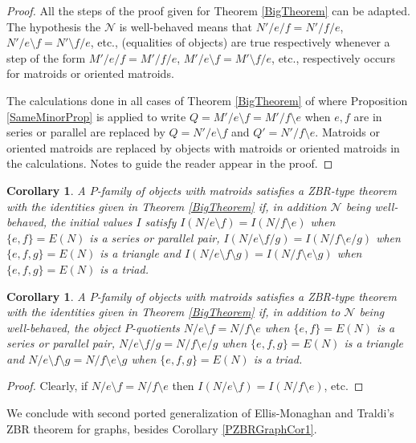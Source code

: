 \documentclass[12pt,leqno]{amsart}
\newtheorem{cor}[lem]{Corollary}
\theoremstyle{remark}
\begin{document}
\begin{proof}
All the steps of the proof given for 
Theorem \ref{BigTheorem} can be adapted.
The hypothesis the $\mathcal{N}$ is well-behaved
means that $N'/e/f = N'/f/e$, $N'/e\setminus f = N'\setminus f/e$, etc.,
(equalities of objects) are true respectively whenever a step of the
form 
$M'/e/f = M'/f/e$, $M'/e\setminus f = M'\setminus f/e$, etc.,
respectively occurs for matroids or oriented matroids.

The calculations done in all cases of Theorem \ref{BigTheorem}
of where 
Proposition \ref{SameMinorProp} is applied to write
$Q = M'/e\setminus f = M'/f\setminus e$ when $e,f$ are in
series or parallel are replaced by 
$Q = N'/e\setminus f$ and $Q' = N'/f\setminus e$.  
Matroids or oriented matroids are replaced
by objects with matroids or oriented matroids in 
the calculations.
Notes to guide the reader appear in the proof.
\end{proof}



\begin{cor}
\label{IVEqualSerParCor}
A $P$-family of objects with matroids satisfies a ZBR-type theorem
with the identities given in Theorem \ref{BigTheorem} if, 
in 
addition $\mathcal{N}$ being well-behaved,
the initial values $I$ satisfy
$I(N/e\setminus f)=I(N/f\setminus e)$ when $\{e,f\}=E(N)$ is a series
or parallel pair,
$I(N/e\setminus f/g)=I(N/f\setminus e/g)$ when $\{e,f,g\}=E(N)$ is a 
triangle and 
$I(N/e\setminus f\setminus g)=I(N/f\setminus e\setminus g)$ 
when $\{e,f,g\}=E(N)$ 
is a triad.
\end{cor}


\begin{cor}
A $P$-family of objects with matroids satisfies a ZBR-type theorem
with the identities given in Theorem \ref{BigTheorem} if, in 
addition to $\mathcal{N}$ being well-behaved,
the object $P$-quotients 
$N/e\setminus f=N/f\setminus e$ when $\{e,f\}=E(N)$ is a series
or parallel pair,
$N/e\setminus f/g=N/f\setminus e/g$ when $\{e,f,g\}=E(N)$ is a 
triangle and 
$N/e\setminus f\setminus g=N/f\setminus e\setminus g$ when $\{e,f,g\}=E(N)$ 
is a triad.
\end{cor}

\begin{proof}
Clearly, if $N/e\setminus f=N/f\setminus e$ then 
$I(N/e\setminus f)=I(N/f\setminus e)$, etc.
\end{proof}

We conclude with second ported generalization of 
Ellis-Monaghan and Traldi's ZBR theorem for graphs,
besides Corollary \ref{PZBRGraphCor1}.
\end{document}
